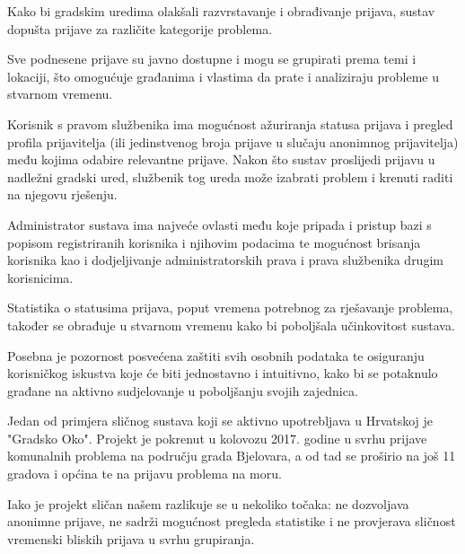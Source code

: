 Kako bi gradskim uredima olakšali razvrstavanje i obrađivanje prijava, sustav dopušta prijave za različite kategorije problema.

Sve podnesene prijave su javno dostupne i mogu se grupirati prema temi i lokaciji, što omogućuje građanima i vlastima da prate i analiziraju probleme u stvarnom vremenu.

Korisnik s pravom službenika ima mogućnost ažuriranja statusa prijava i pregled profila prijavitelja (ili jedinstvenog broja prijave u slučaju anonimnog prijavitelja) među kojima odabire relevantne prijave. Nakon što sustav proslijedi prijavu u nadležni gradski ured, službenik tog ureda može izabrati problem i krenuti raditi na njegovu rješenju.

Administrator sustava ima najveće ovlasti među koje pripada i pristup bazi s popisom registriranih korisnika i njihovim podacima te mogućnost brisanja korisnika kao i dodjeljivanje administratorskih prava i prava službenika drugim korisnicima.

Statistika o statusima prijava, poput vremena potrebnog za rješavanje problema, također se obrađuje u stvarnom vremenu kako bi poboljšala učinkovitost sustava.

Posebna je pozornost posvećena zaštiti svih osobnih podataka te osiguranju korisničkog iskustva koje će biti jednostavno i intuitivno, kako bi se potaknulo građane na aktivno sudjelovanje u poboljšanju svojih zajednica.

Jedan od primjera sličnog sustava koji se aktivno upotrebljava u Hrvatskoj je "Gradsko Oko". Projekt je pokrenut u kolovozu 2017. godine u svrhu prijave komunalnih problema na području grada Bjelovara, a od tad se proširio na još 11 gradova i općina te na prijavu problema na moru.

Iako je projekt sličan našem razlikuje se u nekoliko točaka: ne dozvoljava anonimne prijave, ne sadrži mogućnost pregleda statistike i ne provjerava sličnost vremenski bliskih prijava u svrhu grupiranja.



